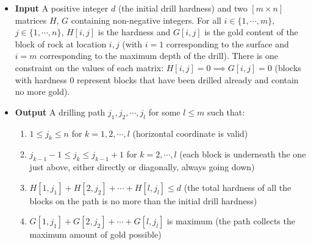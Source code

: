 \documentclass[11pt]{article}
\begin{document}
\begin{itemize}
  \item \textbf{Input} A positive integer $d$ (the initial drill hardness) and two $[m \times n]$ matrices $H$, $G$ containing non-negative integers. For all $i \in \{1, \cdots,m\}$, $j\in \{1,\cdots,n\}$, $H[i,j]$ is the hardness and $G[i,j]$ is the gold content of the block of rock at location $i,j$ (with $i = 1$ corresponding to the surface and $i = m$ corresponding to the maximum depth of the drill). There is one constraint on the values of each matrix: $H[i,j] = 0 \implies G[i,j] = 0$ (blocks with hardness 0 represent blocks that have been drilled already and contain no more gold).
  \item \textbf{Output} A drilling path $j_1,j_2,\cdots,j_l$ for some $l \leq m$ such that:
  \begin{enumerate}
    \item $1\leq j_k \leq n$ for $k=1,2, \cdots, l$  (horizontal coordinate is valid)
    \item $j_{k-1} - 1\leq j_k \leq j_{k-1} + 1$ for $k = 2,\cdots, l$ (each block is underneath the one just above, either directly or diagonally, always going down)
    \item $H[1,j_1]+H[2,j_2]+\cdots+H[l,j_l] \leq d$ (the total hardness of all the blocks on the path is no more than the initial drill hardness)
    \item $G[1,j_1]+G[2,j_2]+\cdots+G[l,j_l]$ is maximum (the path collects the maximum amount of gold possible)
  \end{enumerate}
\end{itemize}
\end{document}
